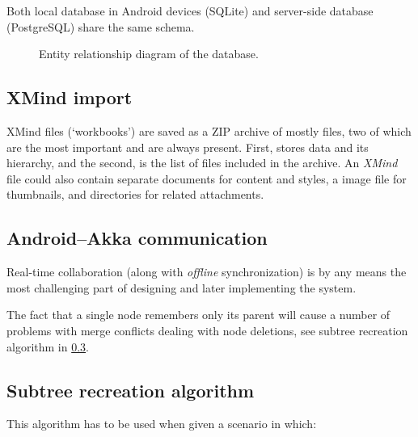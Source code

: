 Both local database in Android devices (SQLite) and server-side database (PostgreSQL) share the same schema.

\begin{figure}[h]
	\centering
	\caption{Entity relationship diagram of the database.}
	\label{fig:erd}
\end{figure}

\subsection{XMind import}
\label{subsec:xmind-exchange}

XMind files (`workbooks') are saved as a ZIP archive of mostly  files, two of which are the most important and are always present. First,  stores data and its hierarchy, and the second,  is the list of files included in the archive. An {\em XMind} file could also contain separate  documents for content and styles, a  image file for thumbnails, and directories for related attachments. \cite{XMind:2009:Format}


\subsection{Android--Akka communication}
\label{subsec:android-akka-comm}

Real-time collaboration (along with \emph{offline} synchronization) is by any means the most challenging part of designing and later implementing the system.


The fact that a single node remembers only its parent will cause a number of problems with merge conflicts dealing with node deletions, see subtree recreation algorithm in \cref{subsec:subtree-recreation}.

\subsection{Subtree recreation algorithm}
\label{subsec:subtree-recreation}

This algorithm has to be used when given a scenario in which:


